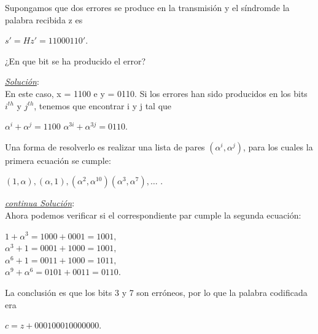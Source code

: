 \begin{frame}  \small  

\begin{ejemplo}

Supongamos que dos errores se produce en la transmisión y el síndromde la palabra recibida z es 

\begin{center}
$s' = Hz' = 1100 0110'.$
\end{center}

¿En que bit se ha producido el error?\\
\end{ejemplo}
\end{frame} 


\begin{frame}  \small  
\textit{\underline{Solución}}:\\

En este caso, x = 1100 e y = 0110. Si los errores han sido producidos en los bits $i^{th}$ y $j^{th}$, tenemos que encontrar i y j tal que 

\begin{center}
$\alpha^i + \alpha^j = 1100$	  $\alpha^{3i} + \alpha^{3j} = 0110.$
\end{center}

Una forma de resolverlo es realizar una lista de pares $(\alpha^i, \alpha ^j)$, para los cuales la primera ecuación se cumple:

\begin{center}
$(1,\alpha), (\alpha,1), (\alpha^2,\alpha^{10}) (\alpha^3,\alpha^7), \ldots$ .
\end{center}

\end{frame} 

\begin{frame}  \small  
\textit{\underline{continua Solución}}:\\

Ahora podemos verificar si el correspondiente par cumple la segunda ecuación:

\begin{center}
$1+\alpha^3 =1000+0001=1001,$\\
$\alpha^3 +1=0001+1000=1001,$\\
$\alpha^6 +1=0011+1000=1011,$\\
$\alpha^9 +\alpha^6 =0101+0011=0110.$\\
\end{center}

La conclusión es que los bits 3 y 7 son erróneos, por lo que la palabra codificada era

\begin{center}
$c = z + 000100010000000.$
\end{center}


\end{frame} 



